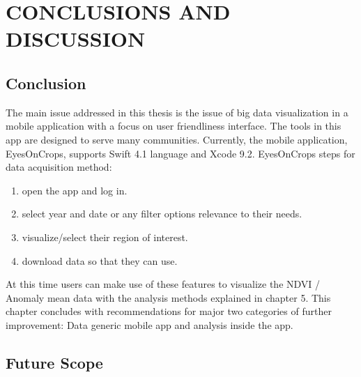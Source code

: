 \chapter{CONCLUSIONS AND DISCUSSION}
\label{chap:conclusion}

\section{Conclusion}

The main issue addressed in this thesis is the issue of big data visualization in a mobile application with a focus on user friendliness interface. The tools in this app are designed to serve many communities. Currently, the mobile application, EyesOnCrops, supports Swift 4.1 language and Xcode 9.2. EyesOnCrops steps for data acquisition method:
\begin{enumerate}
  \item open the app and log in. 
  \item select year and date or any filter options relevance to their needs.
  \item visualize/select their region of interest.
  \item download data so that they can use.
\end{enumerate}

At this time users can make use of these features to visualize the NDVI / Anomaly mean data with the analysis methods explained in chapter 5. 
This chapter concludes with recommendations for major two
categories of further improvement: Data generic mobile app and analysis inside the app.

\section{Future Scope}

